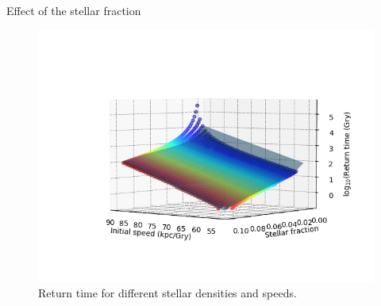 \documentclass{beamer}
\begin{document}
\begin{frame}{Effect of the stellar fraction}
	\begin{figure}[h]
		\centering
		\includegraphics[width=\linewidth]{"../Files/Week 10/Surface"}
		\caption{Return time for different stellar densities and speeds.}
	\end{figure}
\end{frame}
\end{document}
